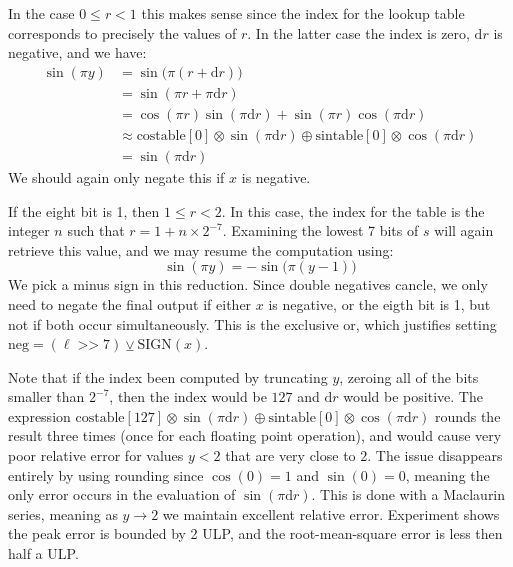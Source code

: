 \documentclass{article}
\theoremstyle{plain}
\begin{document}
        In the case $0\leq{r}<1$ this makes sense since the index for the
        lookup table corresponds to precisely the values of $r$.
        In the latter case the index is zero, $\textrm{d}r$ is negative,
        and we have:
        \begin{align}
            \sin(\pi{y})
            &=\sin\Big(\pi(r+\textrm{d}r)\Big)\\
            &=\sin(\pi{r}+\pi\textrm{d}r)\\
            &=\cos(\pi{r})\sin(\pi\textrm{d}r)
                +\sin(\pi{r})\cos(\pi\textrm{d}r)\\
            &\approx
            \textrm{costable}[0]\otimes\sin(\pi\textrm{d}r)
                \oplus
                \textrm{sintable}[0]\otimes\cos(\pi\textrm{d}r)\\
            &=\sin(\pi\textrm{d}r)
        \end{align}
        We should again only negate this if $x$ is negative.
        \par\hfill\par
        If the eight bit is 1, then $1\leq{r}<2$. In this case, the index for
        the table is the integer $n$ such that $r=1+n\times{2}^{-7}$. Examining
        the lowest 7 bits of $s$ will again retrieve this value, and we may
        resume the computation using:
        \begin{equation}
            \sin(\pi{y})=-\sin\Big(\pi(y-1)\Big)
        \end{equation}
        We pick a minus sign in this reduction. Since double negatives cancle,
        we only need to negate the final output if either $x$ is negative,
        or the eigth bit is 1, but not if both occur simultaneously. This is
        the exclusive or, which justifies setting
        $\textrm{neg}=(\ell\;\texttt{>>}\;7)\veebar\textrm{SIGN}(x)$.
        \par\hfill\par
        Note that if the index been computed by truncating $y$,
        zeroing all of the bits smaller than $2^{-7}$,
        then the index would be $127$ and $\textrm{d}r$
        would be positive. The expression
        $%
            \textrm{costable}[127]\otimes\sin(\pi\textrm{d}r)%
            \oplus%
            \textrm{sintable}[0]\otimes\cos(\pi\textrm{d}r)%
        $
        rounds the result three times (once for each floating point operation),
        and would cause very poor relative error for values $y<2$ that are very
        close to $2$. The issue disappears entirely by using rounding since
        $\cos(0)=1$ and $\sin(0)=0$, meaning the only error occurs in the
        evaluation of $\sin(\pi\textrm{d}r)$. This is done with a Maclaurin
        series, meaning as $y\rightarrow{2}$ we maintain excellent relative
        error. Experiment shows the peak error is bounded by 2 ULP,
        and the root-mean-square error is less then
        half a ULP.
\end{document}
